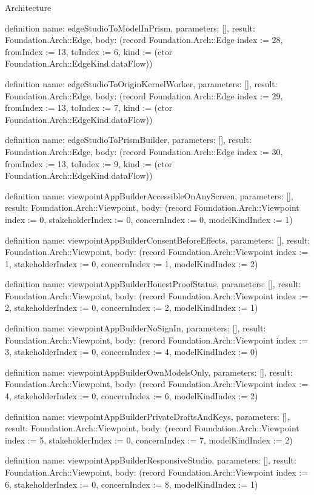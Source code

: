 \begin{lexlean}{Architecture}
\begin{semanticmodule}
definition{
  name: edgeStudioToModelInPrism,
  parameters: [],
  result: Foundation.Arch::Edge,
  body: (record Foundation.Arch::Edge {index := 28, fromIndex := 13, toIndex := 6, kind := (ctor Foundation.Arch::EdgeKind.dataFlow)})
}

definition{
  name: edgeStudioToOriginKernelWorker,
  parameters: [],
  result: Foundation.Arch::Edge,
  body: (record Foundation.Arch::Edge {index := 29, fromIndex := 13, toIndex := 7, kind := (ctor Foundation.Arch::EdgeKind.dataFlow)})
}

definition{
  name: edgeStudioToPrismBuilder,
  parameters: [],
  result: Foundation.Arch::Edge,
  body: (record Foundation.Arch::Edge {index := 30, fromIndex := 13, toIndex := 9, kind := (ctor Foundation.Arch::EdgeKind.dataFlow)})
}

definition{
  name: viewpointAppBuilderAccessibleOnAnyScreen,
  parameters: [],
  result: Foundation.Arch::Viewpoint,
  body: (record Foundation.Arch::Viewpoint {index := 0, stakeholderIndex := 0, concernIndex := 0, modelKindIndex := 1})
}

definition{
  name: viewpointAppBuilderConsentBeforeEffects,
  parameters: [],
  result: Foundation.Arch::Viewpoint,
  body: (record Foundation.Arch::Viewpoint {index := 1, stakeholderIndex := 0, concernIndex := 1, modelKindIndex := 2})
}

definition{
  name: viewpointAppBuilderHonestProofStatus,
  parameters: [],
  result: Foundation.Arch::Viewpoint,
  body: (record Foundation.Arch::Viewpoint {index := 2, stakeholderIndex := 0, concernIndex := 2, modelKindIndex := 1})
}

definition{
  name: viewpointAppBuilderNoSignIn,
  parameters: [],
  result: Foundation.Arch::Viewpoint,
  body: (record Foundation.Arch::Viewpoint {index := 3, stakeholderIndex := 0, concernIndex := 4, modelKindIndex := 0})
}

definition{
  name: viewpointAppBuilderOwnModelsOnly,
  parameters: [],
  result: Foundation.Arch::Viewpoint,
  body: (record Foundation.Arch::Viewpoint {index := 4, stakeholderIndex := 0, concernIndex := 6, modelKindIndex := 2})
}

definition{
  name: viewpointAppBuilderPrivateDraftsAndKeys,
  parameters: [],
  result: Foundation.Arch::Viewpoint,
  body: (record Foundation.Arch::Viewpoint {index := 5, stakeholderIndex := 0, concernIndex := 7, modelKindIndex := 2})
}

definition{
  name: viewpointAppBuilderResponsiveStudio,
  parameters: [],
  result: Foundation.Arch::Viewpoint,
  body: (record Foundation.Arch::Viewpoint {index := 6, stakeholderIndex := 0, concernIndex := 8, modelKindIndex := 1})
}


\end{semanticmodule}
\end{lexlean}
